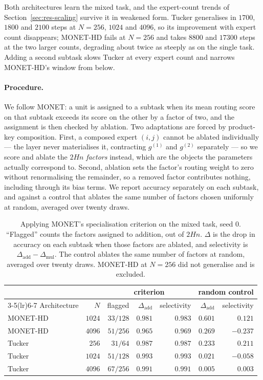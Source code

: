 Both architectures learn the mixed task, and the expert-count trends of
Section~\ref{sec:res-scaling} survive it in weakened form. Tucker generalises
in $1700$, $1800$ and $2100$ steps at $N = 256$, $1024$ and $4096$, so its
improvement with expert count disappears; MONET-HD fails at $N = 256$ and
takes $8800$ and $17300$ steps at the two larger counts, degrading about twice
as steeply as on the single task. Adding a second subtask slows Tucker at every expert count and narrows MONET-HD's window from below.

\paragraph{Procedure.} We follow MONET: a unit is assigned to a subtask when
its mean routing score on that subtask exceeds its score on the other by a
factor of two, and the assignment is then checked by ablation. Two adaptations
are forced by product-key composition. First, a composed expert $(i,j)$ cannot
be ablated individually --- the layer never materialises it, contracting $g^{(1)}$
and $g^{(2)}$ separately --- so we score and ablate the $2Hn$ \emph{factors}
instead, which are the objects the parameters actually correspond to. Second,
ablation sets the factor's routing weight to zero without renormalising the
remainder, so a removed factor contributes nothing, including through its bias
terms. We report accuracy separately on each subtask, and against a control
that ablates the same number of factors chosen uniformly at random, averaged
over twenty draws.

\begin{table}[ht]
\centering
\caption{Applying MONET's specialisation criterion on the mixed task, seed $0$.
``Flagged'' counts the factors assigned to addition, out of $2Hn$. $\Delta$ is
the drop in accuracy on each subtask when those factors are ablated, and
selectivity is $\Delta_{\text{add}} - \Delta_{\text{mul}}$. The control ablates
the same number of factors at random, averaged over twenty draws. MONET-HD at
$N = 256$ did not generalise and is excluded.}
\label{tab:mixed}
\footnotesize
\begin{tabular}{lrrrrrr}
\toprule
 & & \multicolumn{3}{c}{criterion} & \multicolumn{2}{c}{random control} \\
\cmidrule(lr){3-5}\cmidrule(lr){6-7}
Architecture & $N$ & flagged & $\Delta_{\text{add}}$ & selectivity
& $\Delta_{\text{add}}$ & selectivity \\
\midrule
MONET-HD & $1024$ & $33/128$ & $0.981$ & $\mathbf{0.983}$ & $0.601$ & $0.121$ \\
MONET-HD & $4096$ & $51/256$ & $0.965$ & $\mathbf{0.969}$ & $0.269$ & $-0.237$ \\
Tucker   & $256$  & $31/64$  & $0.987$ & $\mathbf{0.987}$ & $0.233$ & $0.211$ \\
Tucker   & $1024$ & $51/128$ & $0.993$ & $\mathbf{0.993}$ & $0.021$ & $-0.058$ \\
Tucker   & $4096$ & $67/256$ & $0.991$ & $\mathbf{0.991}$ & $0.005$ & $0.003$ \\
\bottomrule
\end{tabular}
\end{table}

